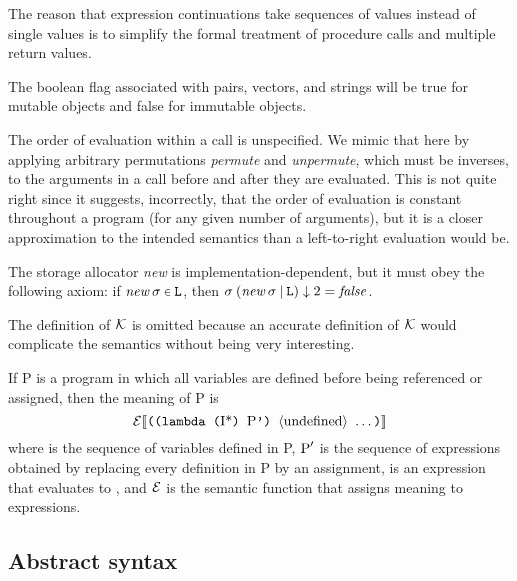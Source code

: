 The reason that expression continuations take sequences of values instead
of single values is to simplify the formal treatment of procedure calls
and multiple return values.

The boolean flag associated with pairs, vectors, and strings will be true
for mutable objects and false for immutable objects.

The order of evaluation within a call is unspecified.  We mimic that
here by applying arbitrary permutations {\it permute} and {\it
unpermute}, which must be inverses, to the arguments in a call before
and after they are evaluated.  This is not quite right since it suggests,
incorrectly, that the order of evaluation is constant throughout a program (for
any given number of arguments), but it is a closer approximation to the intended
semantics than a left-to-right evaluation would be.

The storage allocator {\it new} is implementation-dependent, but it must
obey the following axiom:  if \hbox{$\fun{new}\:\sigma\:\elem\:\LOC$}, then
$\sigma\:(\hbox{\it new}\:\sigma\:\vert\:{\tt{}L})\downarrow 2 = {\it false}$.

\def\P{\hbox{\rm P}}
\def\I{\hbox{\rm I}}
\def\Ksem{\hbox{$\cal K$}}
\def\Esem{\hbox{$\cal E$}}

The definition of $\Ksem$ is omitted because an accurate definition of
$\Ksem$ would complicate the semantics without being very interesting.

If \P{} is a program in which all variables are defined before being
referenced or assigned, then the meaning of \P{} is
$$\Esem\sembrack{\hbox{\tt((lambda (\arbno{\I}) \P')
\hyper{undefined} \dotsfoo)}}$$
where \arbno{\I} is the sequence of variables defined in \P, $\P'$
is the sequence of expressions obtained by replacing every definition
in \P{} by an assignment,  is an expression that evaluates
to , and
$\Esem$ is the semantic function that assigns meaning to expressions.



\subsection{Abstract syntax}

\def\K{\hbox{\rm K}}
\def\I{\hbox{\rm I}}
\def\E{\hbox{\rm E}}
\def\C{\hbox{$\Gamma$}}
\def\Con{\hbox{\rm Con}}
\def\Ide{\hbox{\rm Ide}}
\def\Exp{\hbox{\rm Exp}}
\def\Com{\hbox{\rm Com}}
\def\|{$\vert$}

